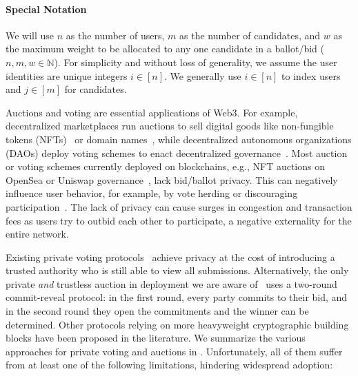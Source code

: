 \paragraph{Special Notation} We will use $n$ as the number of users, $m$ as the number of candidates, and $w$ as the maximum weight to be allocated to any one candidate in a ballot/bid ($n,m,w \in \mathbb{N}$). For simplicity and without loss of generality, we assume the user identities are unique integers $i \in [n]$.
We generally use $i \in [n]$ to index users and $j \in [m]$ for candidates.

Auctions and voting are essential applications of Web3. For example, decentralized marketplaces run auctions to sell digital goods like non-fungible tokens (NFTs)~\cite{opensea_auction} or domain names~\cite{ARXIV:XWYLLX21}, while decentralized autonomous organizations (DAOs) deploy voting schemes to enact decentralized governance~\cite{optimismgov}. Most auction or voting schemes currently deployed on blockchains, e.g., NFT auctions on OpenSea or Uniswap governance~\cite{ARXIV:FriMulWat22}, lack bid/ballot privacy. This can negatively influence user behavior, for example, by vote herding or discouraging participation~\cite{FC:ElkLip04,WTSC:GalYou18,FC:SuzYok03}. The lack of privacy can cause surges in congestion and transaction fees as users try to outbid each other to participate, a negative externality for the entire network.



Existing private voting protocols~\cite{maci,plume,rln} achieve privacy at the cost of introducing a trusted authority who is still able to view all submissions.
Alternatively, the only private \emph{and} trustless auction in deployment we are aware of~\cite{ARXIV:XWYLLX21} uses a two-round commit-reveal protocol: in the first round, every party commits to their bid, and in the second round they open the commitments and the winner can be determined.
Other protocols relying on more heavyweight cryptographic building blocks have been proposed in the literature.
We summarize the various approaches for private voting and auctions in .
Unfortunately, all of them suffer from at least one of the following limitations, hindering widespread adoption:


